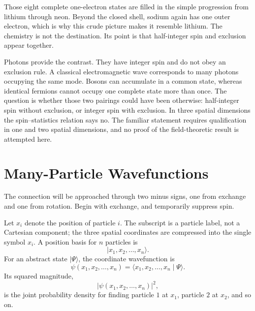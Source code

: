 Those eight complete one-electron states are filled in the simple progression from lithium through neon. Beyond the closed shell, sodium again has one outer electron, which is why this crude picture makes it resemble lithium. The chemistry is not the destination. Its point is that half-integer spin and exclusion appear together.

Photons provide the contrast. They have integer spin and do not obey an exclusion rule. A classical electromagnetic wave corresponds to many photons occupying the same mode. Bosons can accumulate in a common state, whereas identical fermions cannot occupy one complete state more than once. The question is whether those two pairings could have been otherwise: half-integer spin without exclusion, or integer spin with exclusion. In three spatial dimensions the spin--statistics relation says no. The familiar statement requires qualification in one and two spatial dimensions, and no proof of the field-theoretic result is attempted here.

\begin{classroomqa}
\end{classroomqa}

\section{Many-Particle Wavefunctions}

The connection will be approached through two minus signs, one from exchange and one from rotation. Begin with exchange, and temporarily suppress spin.

Let \(x_i\) denote the position of particle \(i\). The subscript is a particle label, not a Cartesian component; the three spatial coordinates are compressed into the single symbol \(x_i\). A position basis for \(n\) particles is
\begin{equation}
\lvert x_1,x_2,\ldots,x_n\rangle.
\end{equation}
For an abstract state \(\lvert\Psi\rangle\), the coordinate wavefunction is
\begin{equation}
\psi(x_1,x_2,\ldots,x_n)
=
\langle x_1,x_2,\ldots,x_n\mid\Psi\rangle.
\end{equation}
Its squared magnitude,
\begin{equation}
\bigl\lvert\psi(x_1,x_2,\ldots,x_n)\bigr\rvert^2,
\end{equation}
is the joint probability density for finding particle \(1\) at \(x_1\), particle \(2\) at \(x_2\), and so on.

